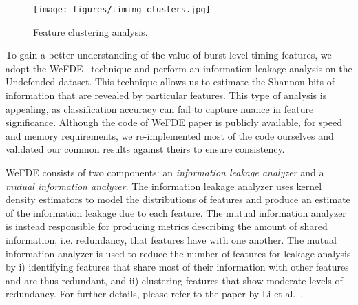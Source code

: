 \documentclass[USenglish,oneside,twocolumn]{article}
\begin{document}
\begin{figure}[!t]
\centering
    \vskip -0.7cm
  \texttt{[image: figures/timing-clusters.jpg]}
  \vskip -0.4cm
  \caption{Feature clustering analysis.}
  \label{fig:feat_cluster}\vskip -0.4cm
\end{figure}

To gain a better understanding of the value of burst-level timing features, we adopt the WeFDE~\cite{infoleak} technique and perform an information leakage analysis on the Undefended dataset. This technique allows us to estimate the Shannon bits of information that are revealed by particular features. This type of analysis is appealing, as classification accuracy can fail to capture nuance in feature significance. Although the code of WeFDE paper is publicly available, for speed and memory requirements, we re-implemented most of the code ourselves and validated our common results against theirs to ensure consistency.

WeFDE consists of two components: an \textit{information leakage analyzer} and a \textit{mutual information analyzer}. The information leakage analyzer uses kernel density estimators to model the distributions of features and produce an estimate of the information leakage due to each feature. The mutual information analyzer is instead responsible for producing metrics describing the amount of shared information, i.e. redundancy, that features have with one another. The mutual information analyzer is used to reduce the number of features for leakage analysis by i) identifying features that share most of their information with other features and are thus redundant, and ii) clustering features that show moderate levels of redundancy. For further details, please refer to the paper by Li et al.~\cite{infoleak}.
\end{document}
